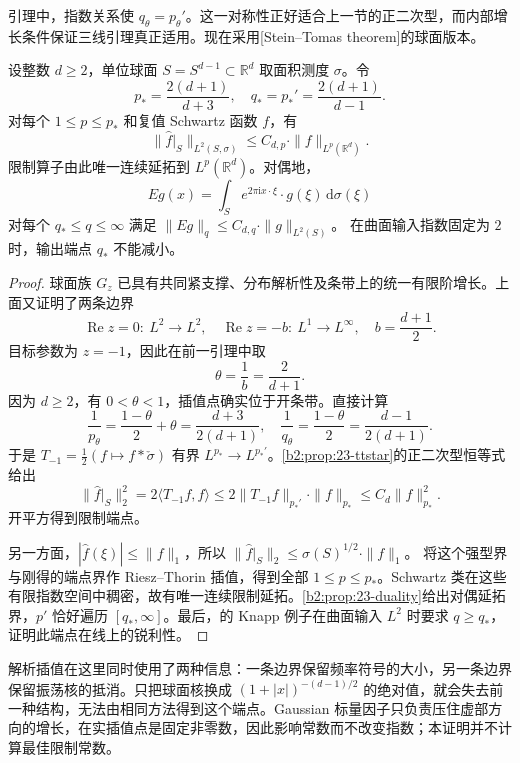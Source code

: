 引理中，指数关系使 \(q_\theta=p_\theta'\)。这一对称性正好适合上一节的正二次型，而内部增长条件保证三线引理真正适用。现在采用[Stein--Tomas theorem]的球面版本。

\begin{theorem}\label{b2:thm:23-stein-tomas}
设整数 \(d\geq2\)，单位球面 \(S=S^{d-1}\subset\mathbb R^d\) 取面积测度 \(\sigma\)。令
\[
 p_*=\frac{2(d+1)}{d+3},\quad
 q_*=p_*'=\frac{2(d+1)}{d-1}.
\]
对每个 \(1\leq p\leq p_*\) 和复值 Schwartz 函数 \(f\)，有
\[
 \|\widehat f|_S\|_{L^2(S,\sigma)}
 \leq C_{d,p}\cdot\|f\|_{L^p(\mathbb R^d)}.
\]
限制算子由此唯一连续延拓到 \(L^p(\mathbb R^d)\)。对偶地，
\[
 Eg(x)=\int_Se^{2\pi\mathrm i x\cdot\xi}
 \cdot g(\xi)\,\mathrm d\sigma(\xi)
\]
对每个 \(q_*\leq q\leq\infty\) 满足
\(\|Eg\|_q\leq C_{d,q}\cdot\|g\|_{L^2(S)}\)。
在曲面输入指数固定为 \(2\) 时，输出端点 \(q_*\) 不能减小。
\end{theorem}
\begin{proof}
球面族 \(G_z\) 已具有共同紧支撑、分布解析性及条带上的统一有限阶增长。上面又证明了两条边界
\[
 \operatorname{Re}z=0:\ L^2\to L^2,
 \quad
 \operatorname{Re}z=-b:\ L^1\to L^\infty,
 \quad b=\frac{d+1}{2}.
\]
目标参数为 \(z=-1\)，因此在前一引理中取
\[
 \theta=\frac1b=\frac2{d+1}.
\]
因为 \(d\geq2\)，有 \(0<\theta<1\)，插值点确实位于开条带。直接计算
\[
 \frac1{p_\theta}=\frac{1-\theta}{2}+\theta
 =\frac{d+3}{2(d+1)},\quad
 \frac1{q_\theta}=\frac{1-\theta}{2}
 =\frac{d-1}{2(d+1)}.
\]
于是 \(T_{-1}=\tfrac12(f\mapsto f*\check\sigma)\) 有界
\(L^{p_*}\to L^{p_*'}\)。\cref{b2:prop:23-ttstar}的正二次型恒等式给出
\[
 \|\widehat f|_S\|_2^2
 =2\langle T_{-1}f,f\rangle
 \leq2\|T_{-1}f\|_{p_*'}\cdot\|f\|_{p_*}
 \leq C_d\|f\|_{p_*}^2.
\]
开平方得到限制端点。

另一方面，\(|\widehat f(\xi)|\leq\|f\|_1\)，所以
\(\|\widehat f|_S\|_2\leq\sigma(S)^{1/2}\cdot\|f\|_1\)。
将这个强型界与刚得的端点界作 Riesz--Thorin 插值，得到全部 \(1\leq p\leq p_*\)。Schwartz 类在这些有限指数空间中稠密，故有唯一连续限制延拓。\cref{b2:prop:23-duality}给出对偶延拓界，\(p'\) 恰好遍历 \([q_*,\infty]\)。最后，的 Knapp 例子在曲面输入 \(L^2\) 时要求 \(q\geq q_*\)，证明此端点在线上的锐利性。
\end{proof}

解析插值在这里同时使用了两种信息：一条边界保留频率符号的大小，另一条边界保留振荡核的抵消。只把球面核换成 \((1+|x|)^{-(d-1)/2}\) 的绝对值，就会失去前一种结构，无法由相同方法得到这个端点。Gaussian 标量因子只负责压住虚部方向的增长，在实插值点是固定非零数，因此影响常数而不改变指数；本证明并不计算最佳限制常数。

